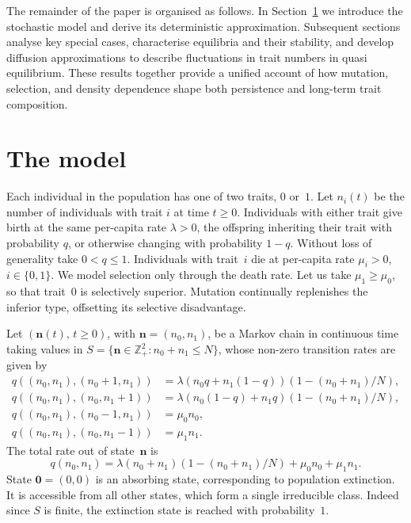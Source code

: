 \documentclass[12pt]{article}
\newcommand\Z{\ensuremath{\mathbb{Z}}}
\newcommand{\bn}{\boldsymbol{n}}
\newcommand{\bzero}{\boldsymbol{0}}
\begin{document}
The remainder of the paper is organised as follows. In
Section~\ref{section:themodel} we introduce the stochastic model and
derive its deterministic approximation. Subsequent sections analyse key
special cases, characterise equilibria and their stability, and develop
diffusion approximations to describe fluctuations in trait numbers in
quasi equilibrium. These results together provide a unified account of how
mutation, selection, and density dependence shape both persistence and
long-term trait composition.

\section{The model}
\label{section:themodel}

Each individual in the population has one of two traits, $0$ or~$1$. Let
$n_i(t)$ be the number of individuals with trait $i$ at time $t\geq 0$.
Individuals with either trait give birth at the same per-capita rate
$\lambda>0$, the offspring inheriting their trait with probability $q$,
or otherwise changing with probability $1-q$. Without loss of generality
take $0<q\leq 1$. Individuals with trait~$i$ die at per-capita rate
$\mu_i>0$, $i\in \{0,1\}$. We model selection only through the death
rate. Let us take $\mu_1\geq \mu_0$, so that trait~$0$ is selectively
superior. Mutation continually replenishes the inferior type, 
offsetting its selective disadvantage.

Let $(\bn(t),\, t\geq 0)$, with $\bn=(n_0,n_1)$, be a Markov chain in
continuous time taking values in $S=\{\bn\in \Z_+^2: n_0+n_1\leq N\}$,
whose non-zero transition rates are given by
\begin{equation}\label{Q}
\begin{aligned}
q((n_0,n_1),(n_0+1,n_1)) &=\lambda (n_0 q + n_1 (1-q)) (1-(n_0+n_1)/N),
\\
q((n_0,n_1),(n_0,n_1+1)) &=\lambda (n_0 (1-q) + n_1 q) (1-(n_0+n_1)/N),
\\
q((n_0,n_1),(n_0-1,n_1)) &=\mu_0 n_0,
\\
q((n_0,n_1),(n_0,n_1-1)) &=\mu_1 n_1.
\end{aligned}
\end{equation}
The total rate out of state~$\bn$ is
\begin{equation}
q(n_0,n_1)= \lambda (n_0+n_1)(1- (n_0+n_1)/N)+\mu_0 n_0 + \mu_1 n_1.
\label{qn}
\end{equation}
State $\bzero=(0,0)$ is an absorbing state, corresponding to
population extinction. 
It is accessible from all other states, which form a single irreducible 
class. Indeed since $S$ is finite, the extinction state
is reached with probability~$1$.
\end{document}
